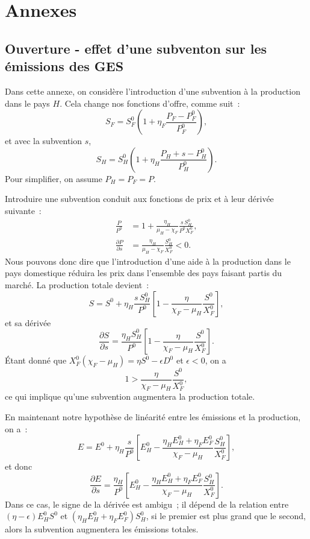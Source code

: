 \chapter{Annexes}

\section{Ouverture - effet d'une subventon sur les émissions des GES}\label{appendix:subventions}

Dans cette annexe, on considère l'introduction d'une subvention à la production dans le pays $H$. Cela change nos fonctions d'offre, comme suit~:
$$
    S_F = S_F^0\left(1 + \eta_F\frac{P_F - P_F^0}{P_F^0}\right),
$$
et avec la subvention $s$,
$$
    S_H = S_H^0\left(1 + \eta_H\frac{P_H + s - P_H^0}{P_H^0}\right).
$$
Pour simplifier, on assume $P_H = P_F = P$.

Introduire une subvention conduit aux fonctions de prix et à leur dérivée suivante~:
\begin{align*}
    \frac{P}{P^0}                 & = 1 + \frac{\eta_H}{\mu_H - \chi_F} \frac{s \, S_H^0}{P^0 X_F^0}, \\
    \frac{\partial P}{\partial s} & = \frac{\eta_H}{\mu_H - \chi_F} \frac{S_H^0}{X_F^0} < 0.
\end{align*}
Nous pouvons donc dire que l'introduction d'une aide à la production dans le pays domestique réduira les prix dans l'ensemble des pays faisant partis du marché.
La production totale devient~:
$$
    S = S^0 + \eta_H \frac{s \, S_H^0}{P^0}\left[1 - \frac{\eta}{\chi_F - \mu_H}\frac{S^0}{X_F^0}\right],
$$
et sa dérivée
$$
    \frac{\partial S}{\partial s} = \frac{\eta_H S_H^0}{P^0}\left[1 - \frac{\eta}{\chi_F - \mu_H}\frac{S^0}{X_F^0}\right].
$$
Étant donné que $X_F^0(\chi_F - \mu_H) = \eta S^0 - \epsilon D^0$ et $\epsilon < 0$, on a
$$
    1 > \frac{\eta}{\chi_F - \mu_H}\frac{S^0}{X_F^0},
$$
ce qui implique qu'une subvention augmentera la production totale.

En maintenant notre hypothèse de linéarité entre les émissions et la production, on a~:
$$
    E = E^0 + \eta_H \frac{s}{P^0}\left[E_H^0 - \frac{\eta_H E_H^0 + \eta_F E_F^0}{\chi_F - \mu_H}\frac{S_H^0}{X_F^0}\right],
$$
et donc
$$
    \frac{\partial E}{\partial s} = \frac{\eta_H}{P^0}\left[E_H^0 - \frac{\eta_H E_H^0 + \eta_F E_F^0}{\chi_F - \mu_H}\frac{S_H^0}{X_F^0}\right].
$$
Dans ce cas, le signe de la dérivée est ambigu~; il dépend de la relation entre $(\eta - \epsilon)E_H^0 S^0$ et $(\eta_H E_H^0 + \eta_F E_F^0) S_H^0$, si le premier est plus grand que le second, alors la subvention augmentera les émissions totales.


